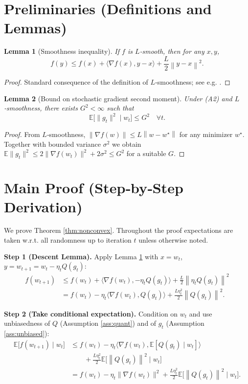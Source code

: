 \documentclass[11pt]{article}
\newtheorem{lemma}{Lemma}
\newcommand{\E}{\mathbb{E}}
\newcommand{\norm}[1]{\left\lVert#1\right\rVert}
\newcommand{\ip}[2]{\langle #1, #2\rangle}
\begin{document}
\section*{Preliminaries (Definitions and Lemmas)}
\begin{lemma}[Smoothness inequality]\label{lem:smooth}
If $f$ is $L$‑smooth, then for any $x,y$,
\[
f(y)\le f(x)+\ip{\nabla f(x)}{y-x}+\frac{L}{2}\norm{y-x}^{2}.
\tag{L1}
\]
\end{lemma}
\begin{proof}
Standard consequence of the definition of $L$‑smoothness; see e.g. \cite{Nesterov2004}.
\end{proof}
\begin{lemma}[Bound on stochastic gradient second moment]\label{lem:gradbound}
Under (A2) and $L$‑smoothness, there exists $G^{2}<\infty$ such that
\[
\E\bigl[\|g_t\|^{2}\mid w_t\bigr]\le G^{2}\quad\forall t.
\tag{L2}
\]
\end{lemma}
\begin{proof}
From $L$‑smoothness, $\|\nabla f(w)\|\le L\norm{w-w^{\star}}$ for any minimizer $w^{\star}$. Together with bounded variance $\sigma^{2}$ we obtain $\E\|g_t\|^{2}\le 2\|\nabla f(w_t)\|^{2}+2\sigma^{2}\le G^{2}$ for a suitable $G$.
\end{proof}
\section*{Main Proof (Step‑by‑Step Derivation)}
We prove Theorem \ref{thm:nonconvex}.  Throughout the proof expectations are taken w.r.t. all randomness up to iteration $t$ unless otherwise noted.

\bigskip
\noindent\textbf{Step 1 (Descent Lemma).}  
Apply Lemma \ref{lem:smooth} with $x=w_t$, $y=w_{t+1}=w_t-\eta_t Q(g_t)$:
\begin{align}
f(w_{t+1})
&\le f(w_t) + \ip{\nabla f(w_t)}{-\eta_t Q(g_t)} + \frac{L}{2}\norm{\eta_t Q(g_t)}^{2}\nonumber\\
&= f(w_t) - \eta_t\ip{\nabla f(w_t)}{Q(g_t)} + \frac{L\eta_t^{2}}{2}\norm{Q(g_t)}^{2}.
\tag{4}
\end{align}
\medskip

\noindent\textbf{Step 2 (Take conditional expectation).}  
Condition on $w_t$ and use unbiasedness of $Q$ (Assumption \ref{ass:quant}) and of $g_t$ (Assumption \ref{ass:unbiased}):
\begin{align}
\E\!\bigl[f(w_{t+1})\mid w_t\bigr]
&\le f(w_t) - \eta_t\ip{\nabla f(w_t)}{\E[Q(g_t)\mid w_t]}\nonumber\\
&\qquad + \frac{L\eta_t^{2}}{2}\E\!\bigl[\norm{Q(g_t)}^{2}\mid w_t\bigr]\nonumber\\
&= f(w_t) - \eta_t\|\nabla f(w_t)\|^{2}
   + \frac{L\eta_t^{2}}{2}\E\!\bigl[\norm{Q(g_t)}^{2}\mid w_t\bigr].
\tag{5}
\end{align}
\medskip
\end{document}
